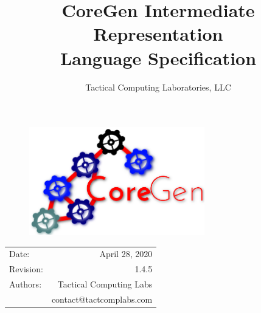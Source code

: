 \documentclass{article}
\title{CoreGen Intermediate Representation\\Language Specification} %
\author{Tactical Computing Laboratories, LLC} %
\date{} %
\begin{document}
\begin{figure}
\begin{center}
\includegraphics[width=3in]{figures/coregen-logo.png} %
\end{center}
\end{figure}

\maketitle %
\thispagestyle{fancy} %

\begin{center}
\begin{tabular}{l r}
Date: & April 28, 2020 \\ %
Revision: & 1.4.5 \\         %
Authors: & Tactical Computing Labs\\ %
& contact@tactcomplabs.com\\
\end{tabular}
\end{center}


\clearpage
\tableofcontents
\clearpage


\clearpage
\listoffigures
\lstlistoflistings
\listoftables
\clearpage

\end{document}
